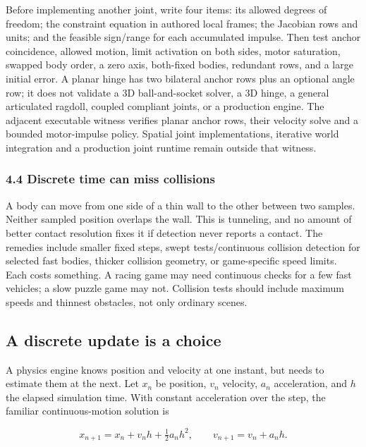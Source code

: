 Before implementing another joint, write four items: its allowed degrees of freedom; the constraint equation in authored local frames; the Jacobian rows and units; and the feasible sign/range for each accumulated impulse. Then test anchor coincidence, allowed motion, limit activation on both sides, motor saturation, swapped body order, a zero axis, both-fixed bodies, redundant rows, and a large initial error. A planar hinge has two bilateral anchor rows plus an optional angle row; it does not validate a 3D ball-and-socket solver, a 3D hinge, a general articulated ragdoll, coupled compliant joints, or a production engine. The adjacent executable witness verifies planar anchor rows, their velocity solve and a bounded motor-impulse policy. Spatial joint implementations, iterative world integration and a production joint runtime remain outside that witness.

\subsubsection{4.4 Discrete time can miss collisions}\label{06-engine-ii-ch033-discrete-time-can-miss-collisions}

A body can move from one side of a thin wall to the other between two samples. Neither sampled position overlaps the wall. This is tunneling, and no amount of better contact resolution fixes it if detection never reports a contact. The remedies include smaller fixed steps, swept tests/continuous collision detection for selected fast bodies, thicker collision geometry, or game-specific speed limits. Each costs something. A racing game may need continuous checks for a few fast vehicles; a slow puzzle game may not. Collision tests should include maximum speeds and thinnest obstacles, not only ordinary scenes.

\subsection{A discrete update is a choice}\label{06-engine-ii-ch033-a-discrete-update-is-a-choice}

A physics engine knows position and velocity at one instant, but needs to estimate them at the next. Let \(x_n\) be position, \(v_n\) velocity, \(a_n\) acceleration, and \(h\) the elapsed simulation time. With constant acceleration over the step, the familiar continuous-motion solution is

\[
x_{n+1}=x_n+v_n h+\tfrac12 a_n h^2, \qquad v_{n+1}=v_n+a_n h.
\]

